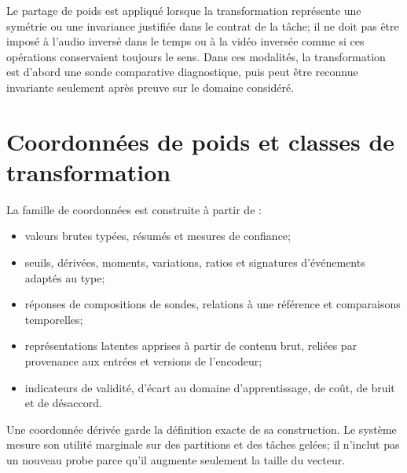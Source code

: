 \documentclass[11pt,a4paper]{report}
\begin{document}
Le partage de poids est appliqué lorsque la transformation représente une symétrie ou une invariance justifiée dans le contrat de la tâche; il ne doit pas être imposé à l'audio inversé dans le temps ou à la vidéo inversée comme si ces opérations conservaient toujours le sens. Dans ces modalités, la transformation est d'abord une sonde comparative diagnostique, puis peut être reconnue invariante seulement après preuve sur le domaine considéré.

\section{Coordonnées de poids et classes de transformation}
La famille de coordonnées est construite à partir de :
\begin{itemize}[leftmargin=1.5em]
\item valeurs brutes typées, résumés et mesures de confiance;
\item seuils, dérivées, moments, variations, ratios et signatures d'événements adaptés au type;
\item réponses de compositions de sondes, relations à une référence et comparaisons temporelles;
\item représentations latentes apprises à partir de contenu brut, reliées par provenance aux entrées et versions de l'encodeur;
\item indicateurs de validité, d'écart au domaine d'apprentissage, de coût, de bruit et de désaccord.
\end{itemize}
Une coordonnée dérivée garde la définition exacte de sa construction. Le système mesure son utilité marginale sur des partitions et des tâches gelées; il n'inclut pas un nouveau probe parce qu'il augmente seulement la taille du vecteur.
\end{document}
